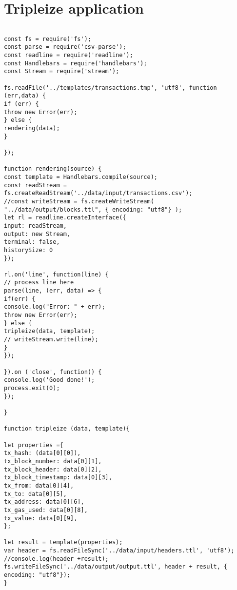 \chapter{Tripleize application}
\small
\vspace{0.2in}
\begin{lstlisting}

const fs = require('fs');
const parse = require('csv-parse');
const readline = require('readline');
const Handlebars = require('handlebars');
const Stream = require('stream');

fs.readFile('../templates/transactions.tmp', 'utf8', function (err,data) {
if (err) {
throw new Error(err);
} else {
rendering(data);
}

});

function rendering(source) {
const template = Handlebars.compile(source);
const readStream = fs.createReadStream('../data/input/transactions.csv');
//const writeStream = fs.createWriteStream( "../data/output/blocks.ttl", { encoding: "utf8"} );
let rl = readline.createInterface({
input: readStream,
output: new Stream,
terminal: false,
historySize: 0
});

rl.on('line', function(line) {
// process line here
parse(line, (err, data) => {
if(err) {
console.log("Error: " + err);
throw new Error(err);
} else {
tripleize(data, template);
// writeStream.write(line);  
}      
});

}).on ('close', function() {
console.log('Good done!');
process.exit(0);
});

}

function tripleize (data, template){

let properties ={
tx_hash: (data[0][0]),
tx_block_number: data[0][1],
tx_block_header: data[0][2],
tx_block_timestamp: data[0][3],
tx_from: data[0][4],
tx_to: data[0][5],
tx_address: data[0][6],
tx_gas_used: data[0][8],
tx_value: data[0][9],
};

let result = template(properties);
var header = fs.readFileSync('../data/input/headers.ttl', 'utf8');
//console.log(header +result);
fs.writeFileSync('../data/output/output.ttl', header + result, { encoding: "utf8"});  
}


\end{lstlisting}